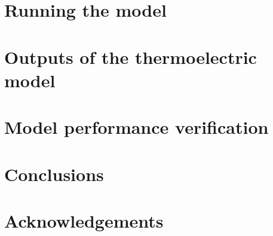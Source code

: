 \documentclass[preprint]{elsarticle/elsarticle}
\begin{document}
\section{Running the model}


\section{Outputs of the thermoelectric model}


\section{Model performance verification}


\section{Conclusions}


\section{Acknowledgements}




\end{document}
